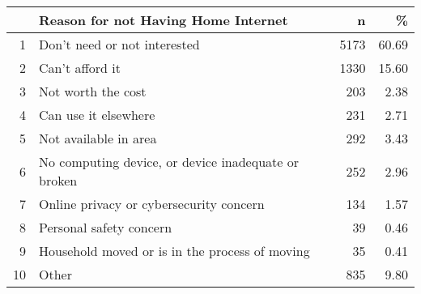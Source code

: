 \begin{table}[ht]
\centering
\begin{tabular}{rlrr}
  \hline
 & Reason for not Having Home Internet & n & \% \\ 
  \hline
1 & Don't need or not interested & 5173 & 60.69 \\ 
  2 & Can't afford it & 1330 & 15.60 \\ 
  3 & Not worth the cost & 203 & 2.38 \\ 
  4 & Can use it elsewhere & 231 & 2.71 \\ 
  5 & Not available in area & 292 & 3.43 \\ 
  6 & No computing device, or device inadequate or broken & 252 & 2.96 \\ 
  7 & Online privacy or cybersecurity concern & 134 & 1.57 \\ 
  8 & Personal safety concern &  39 & 0.46 \\ 
  9 & Household moved or is in the process of moving &  35 & 0.41 \\ 
  10 & Other & 835 & 9.80 \\ 
   \hline
\end{tabular}
\end{table}
